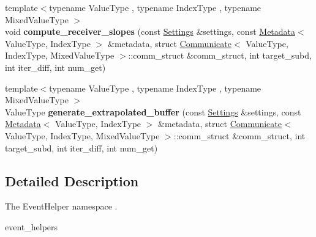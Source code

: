 \begin{DoxyCompactItemize}
\item 
\mbox{\label{namespaceschwz_1_1EventHelpers_a8b4074a3854542790fe7e71da7680ed3}} 
{\footnotesize template$<$typename Value\+Type , typename Index\+Type , typename Mixed\+Value\+Type $>$ }\\void {\bfseries compute\+\_\+receiver\+\_\+slopes} (const \hyperlink{structschwz_1_1Settings}{Settings} \&settings, const \hyperlink{structschwz_1_1Metadata}{Metadata}$<$ Value\+Type, Index\+Type $>$ \&metadata, struct \hyperlink{classschwz_1_1Communicate}{Communicate}$<$ Value\+Type, Index\+Type, Mixed\+Value\+Type $>$\+::comm\+\_\+struct \&comm\+\_\+struct, int target\+\_\+subd, int iter\+\_\+diff, int num\+\_\+get)
\item 
\mbox{\label{namespaceschwz_1_1EventHelpers_a750dc14b8dcf40cbefc915ae42ea6fa7}} 
{\footnotesize template$<$typename Value\+Type , typename Index\+Type , typename Mixed\+Value\+Type $>$ }\\Value\+Type {\bfseries generate\+\_\+extrapolated\+\_\+buffer} (const \hyperlink{structschwz_1_1Settings}{Settings} \&settings, const \hyperlink{structschwz_1_1Metadata}{Metadata}$<$ Value\+Type, Index\+Type $>$ \&metadata, struct \hyperlink{classschwz_1_1Communicate}{Communicate}$<$ Value\+Type, Index\+Type, Mixed\+Value\+Type $>$\+::comm\+\_\+struct \&comm\+\_\+struct, int target\+\_\+subd, int iter\+\_\+diff, int num\+\_\+get)
\end{DoxyCompactItemize}


\subsection{Detailed Description}
The Event\+Helper namespace . 

event\+\_\+helpers 